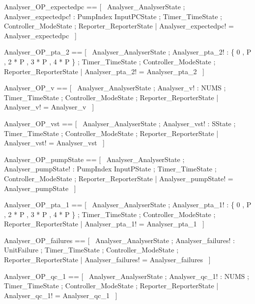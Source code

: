 \documentclass{article}
\begin{document}
\begin{zed}
	Analyser\_OP\_expectedpc == [~  \Xi Analyser\_AnalyserState ; Analyser\_expectedpc! : PumpIndex \fun InputPCState ; \Xi Timer\_TimeState ; \Xi Controller\_ModeState ; \Xi Reporter\_ReporterState | Analyser\_expectedpc! = Analyser\_expectedpc  ~]
\end{zed}

\begin{zed}
	Analyser\_OP\_pta\_2 == [~  \Xi Analyser\_AnalyserState ; Analyser\_pta\_2! : \{ 0 , P , 2 * P , 3 * P , 4 * P \} ; \Xi Timer\_TimeState ; \Xi Controller\_ModeState ; \Xi Reporter\_ReporterState | Analyser\_pta\_2! = Analyser\_pta\_2  ~]
\end{zed}

\begin{zed}
	Analyser\_OP\_v == [~  \Xi Analyser\_AnalyserState ; Analyser\_v! : NUMS ; \Xi Timer\_TimeState ; \Xi Controller\_ModeState ; \Xi Reporter\_ReporterState | Analyser\_v! = Analyser\_v  ~]
\end{zed}

\begin{zed}
	Analyser\_OP\_vst == [~  \Xi Analyser\_AnalyserState ; Analyser\_vst! : SState ; \Xi Timer\_TimeState ; \Xi Controller\_ModeState ; \Xi Reporter\_ReporterState | Analyser\_vst! = Analyser\_vst  ~]
\end{zed}

\begin{zed}
	Analyser\_OP\_pumpState == [~  \Xi Analyser\_AnalyserState ; Analyser\_pumpState! : PumpIndex \fun InputPState ; \Xi Timer\_TimeState ; \Xi Controller\_ModeState ; \Xi Reporter\_ReporterState | Analyser\_pumpState! = Analyser\_pumpState  ~]
\end{zed}

\begin{zed}
	Analyser\_OP\_pta\_1 == [~  \Xi Analyser\_AnalyserState ; Analyser\_pta\_1! : \{ 0 , P , 2 * P , 3 * P , 4 * P \} ; \Xi Timer\_TimeState ; \Xi Controller\_ModeState ; \Xi Reporter\_ReporterState | Analyser\_pta\_1! = Analyser\_pta\_1  ~]
\end{zed}

\begin{zed}
	Analyser\_OP\_failures == [~  \Xi Analyser\_AnalyserState ; Analyser\_failures! : \power UnitFailure ; \Xi Timer\_TimeState ; \Xi Controller\_ModeState ; \Xi Reporter\_ReporterState | Analyser\_failures! = Analyser\_failures  ~]
\end{zed}

\begin{zed}
	Analyser\_OP\_qc\_1 == [~  \Xi Analyser\_AnalyserState ; Analyser\_qc\_1! : NUMS ; \Xi Timer\_TimeState ; \Xi Controller\_ModeState ; \Xi Reporter\_ReporterState | Analyser\_qc\_1! = Analyser\_qc\_1  ~]
\end{zed}
\end{document}
